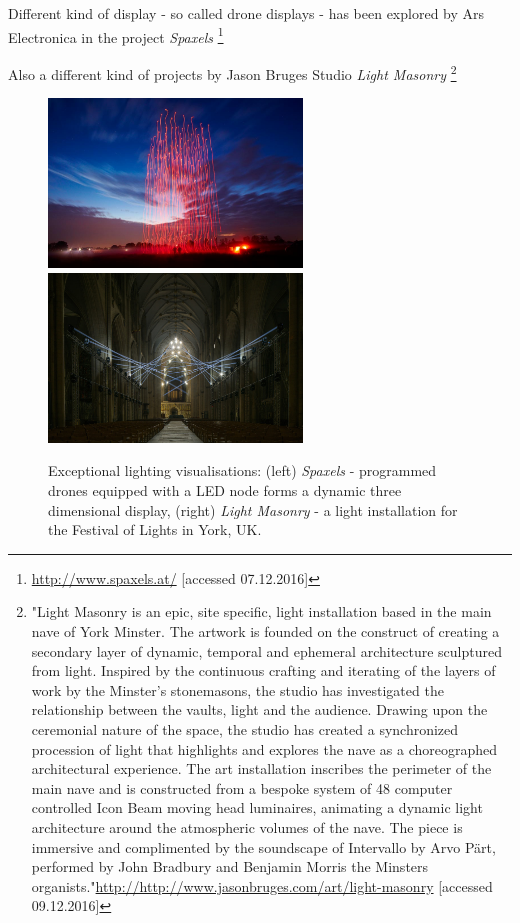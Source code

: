 Different kind of display - so called drone displays - has been explored by Ars Electronica in the project \textit{Spaxels}  \footnote{\url{http://www.spaxels.at/} [accessed 07.12.2016]}

Also a different kind of projects by Jason Bruges Studio  \textit{Light Masonry}  \footnote{"Light Masonry is an epic, site specific, light installation based in the main nave of York Minster. The artwork is founded on the construct of creating a secondary layer of dynamic, temporal and ephemeral architecture sculptured from light. Inspired by the continuous crafting and iterating of the layers of work by the Minster’s stonemasons, the studio has investigated the relationship between the vaults, light and the audience. Drawing upon the ceremonial nature of the space, the studio has created a synchronized procession of light that highlights and explores the nave as a choreographed architectural experience. The art installation inscribes the perimeter of the main nave and is constructed from a bespoke system of 48 computer controlled Icon Beam moving head luminaires, animating a dynamic light architecture around the atmospheric volumes of the nave. The piece is immersive and complimented by the soundscape of Intervallo by Arvo Pärt, performed by John Bradbury and Benjamin Morris the Minsters organists."\url{http://http://www.jasonbruges.com/art/light-masonry} [accessed 09.12.2016]} 



\begin{figure} [h!]
    \centering
        \includegraphics[height=4.5cm]{Illustrations/spaxels.jpg}
        \includegraphics[height=4.5cm]{Illustrations/JasonBruges.jpeg}
    \caption[Exceptional lighting visualisations]{Exceptional lighting visualisations: (left) \textit{Spaxels} - programmed drones equipped with a LED node forms a dynamic three dimensional display, (right) \textit{Light Masonry} - a light installation for the Festival of Lights in York, UK. }
    \label{InterfacingArchitecture}
\end{figure}

